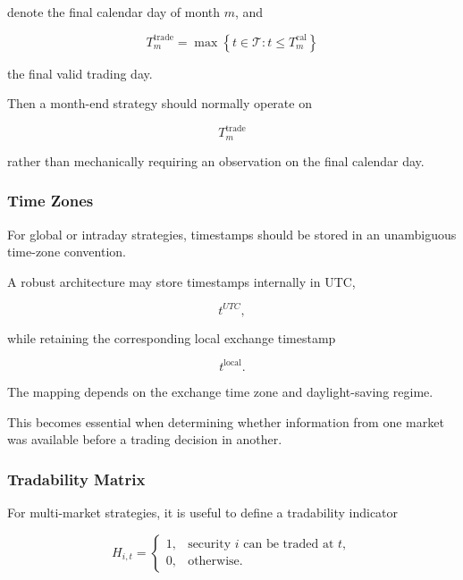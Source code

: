\documentclass[11pt,a4paper]{article}
\begin{document}
denote the final calendar day of month $m$, and

\begin{equation}
T_m^{\mathrm{trade}}
=
\max
\left\{
t\in\mathcal{T}:
t\leq T_m^{\mathrm{cal}}
\right\}
\end{equation}

the final valid trading day.

Then a month-end strategy should normally operate on

\begin{equation}
\boxed{
T_m^{\mathrm{trade}}
}
\end{equation}

rather than mechanically requiring an observation on the final calendar day.


\subsubsection{Time Zones}

For global or intraday strategies, timestamps should be stored in an
unambiguous time-zone convention.

A robust architecture may store timestamps internally in UTC,

\begin{equation}
t^{UTC},
\end{equation}

while retaining the corresponding local exchange timestamp

\begin{equation}
t^{\mathrm{local}}.
\end{equation}

The mapping depends on the exchange time zone and daylight-saving regime.

This becomes essential when determining whether information from one market
was available before a trading decision in another.


\subsubsection{Tradability Matrix}

For multi-market strategies, it is useful to define a tradability indicator

\begin{equation}
H_{i,t}
=
\begin{cases}
1,
&
\text{security }i\text{ can be traded at }t,
\\
0,
&
\text{otherwise}.
\end{cases}
\end{equation}
\end{document}
